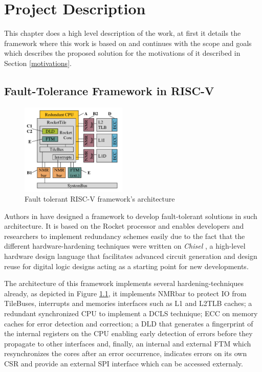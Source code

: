 \documentclass[10pt, a4paper]{report}
\begin{document}
\chapter{Project Description}
\thispagestyle{fancy}

This chapter does a high level description of the work, at first it details the
framework where this work is based on and continues with the scope and goals
which describes the proposed solution for the motivations of it described in 
Section \ref{motivations}.

\section{Fault-Tolerance Framework in RISC-V}\label{framework_riscv}

\begin{figure}[h!]
    \begin{center}
        \includegraphics[width=0.45\textwidth]{framework_arch.png}
        \caption{Fault tolerant RISC-V framework's architecture}
        \label{framework_arch}
    \end{center}
\end{figure}

Authors in \cite{fault_tolerance_framework} have designed a framework to develop 
fault-tolerant solutions in such architecture. It is based on the Rocket 
processor \cite{rocket_chip_paper} and enables developers and
researchers to implement redundancy schemes easily due to the fact that the
different hardware-hardening techniques were written on \emph{Chisel} 
\cite{chisel_paper}, a high-level hardware design language that facilitates 
advanced circuit generation and design reuse for digital logic designs acting as 
a starting point for new developments.

The architecture of this framework implements several hardening-techniques
already, as depicted in Figure \ref{framework_arch}, it implements
\acrfull{NMRbar} to protect \acrfull{IO} from TileBuses, interrupts and memories
interfaces such as L1 and L2TLB caches; a redundant synchronized \acrfull{CPU} 
to implement a \acrshort{DCLS} technique; \acrfull{ECC} on memory caches for
error detection and correction; a \acrfull{DLD} that generates a fingerprint of
the internal registers on the \acrshort{CPU} enabling early detection of errors
before they propagate to other interfaces and, finally, an internal and external 
\acrfull{FTM} which resynchronizes the cores after an error occurrence,
indicates errors on its own \acrfull{CSR} and provide an external \acrfull{SPI}
interface which can be accessed externaly.
\end{document}
